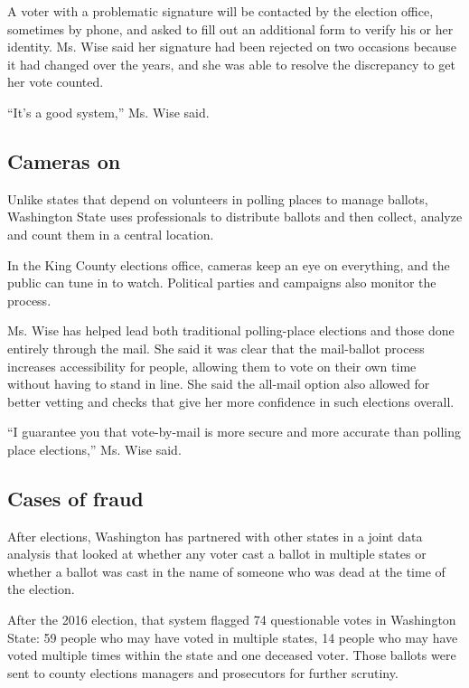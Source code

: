 A voter with a problematic signature will be contacted by the election
office, sometimes by phone, and asked to fill out an additional form to
verify his or her identity. Ms. Wise said her signature had been
rejected on two occasions because it had changed over the years, and she
was able to resolve the discrepancy to get her vote counted.

``It's a good system,'' Ms. Wise said.

\hypertarget{cameras-on}{%
\subsection{Cameras on}\label{cameras-on}}

Unlike states that depend on volunteers in polling places to manage
ballots, Washington State uses professionals to distribute ballots and
then collect, analyze and count them in a central location.

In the King County elections office, cameras keep an eye on everything,
and the public can tune in to watch. Political parties and campaigns
also monitor the process.

Ms. Wise has helped lead both traditional polling-place elections and
those done entirely through the mail. She said it was clear that the
mail-ballot process increases accessibility for people, allowing them to
vote on their own time without having to stand in line. She said the
all-mail option also allowed for better vetting and checks that give her
more confidence in such elections overall.

``I guarantee you that vote-by-mail is more secure and more accurate
than polling place elections,'' Ms. Wise said.

\hypertarget{cases-of-fraud}{%
\subsection{Cases of fraud}\label{cases-of-fraud}}

After elections, Washington has partnered with other states in a joint
data analysis that looked at whether any voter cast a ballot in multiple
states or whether a ballot was cast in the name of someone who was dead
at the time of the election.

After the 2016 election, that system flagged 74 questionable votes in
Washington State: 59 people who may have voted in multiple states, 14
people who may have voted multiple times within the state and one
deceased voter. Those ballots were sent to county elections managers and
prosecutors for further scrutiny.

